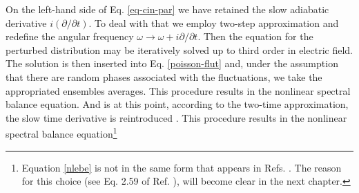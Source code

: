\documentclass[12pt,a4paper,ruledheader]{report}
\begin{document}
On the left-hand side of  Eq. \eqref{eq-cin-par} we have retained the
slow adiabatic derivative $i(\partial/\partial t)$. To deal with
that we employ two-step approximation \cite{Yoon00} and redefine
the angular frequency $\omega \rightarrow \omega+i \partial/\partial t$.
Then the equation for the
perturbed distribution may be iteratively
solved up to third order in electric field.  The solution is then
inserted into Eq. \eqref{poisson-flut}
and,  under the assumption that there are random phases associated with
the fluctuations, we take the appropriated ensembles averages. This
procedure results in the nonlinear spectral balance equation.
And is at this point, according to the two-time approximation, the
slow time derivative is reintroduced \cite{YZKS16}. This procedure
results in the nonlinear spectral balance equation\footnote{Equation
  \eqref{nlebe} is not in the same form that appears in Refs.
  \cite{Yoon00,Tigik2015}. The reason for this choice (see Eq. 2.59
  of Ref. \cite{YZKS16}), will become clear in the next chapter.}
\end{document}
